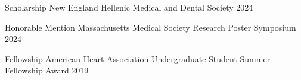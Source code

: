 



\begin{cvhonors}

  \cvhonor
    {Scholarship} %
    {New England Hellenic Medical and Dental Society} %
    {2024} %

  \cvhonor
    {Honorable Mention} %
    {Massachusetts Medical Society Research Poster Symposium} %
    {2024} %

  \cvhonor
    {Fellowship} %
    {American Heart Association Undergraduate Student Summer Fellowship Award} %
    {2019} %

\end{cvhonors}




